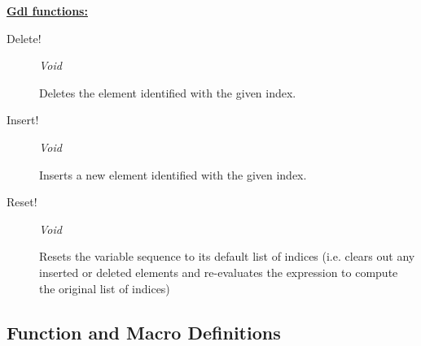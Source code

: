 \documentclass [11pt]{book}
\begin{document}
\begin{itemize}
\textbf{
\underline{Gdl functions:}}

\begin{description}

\item [Delete!]
\emph{Void}

 Deletes the element identified with the given index.




\item [Insert!]
\emph{Void}

 Inserts a new element identified with the given index.




\item [Reset!]
\emph{Void}

 Resets the variable sequence to its default list of indices (i.e. clears out any inserted or deleted elements and
re-evaluates the expression to compute the original list of indices)




\end{description}







\end{itemize}



\subsection{Function and Macro Definitions}

\label{subsec:functionandmacrodefinitions}
\end{document}
